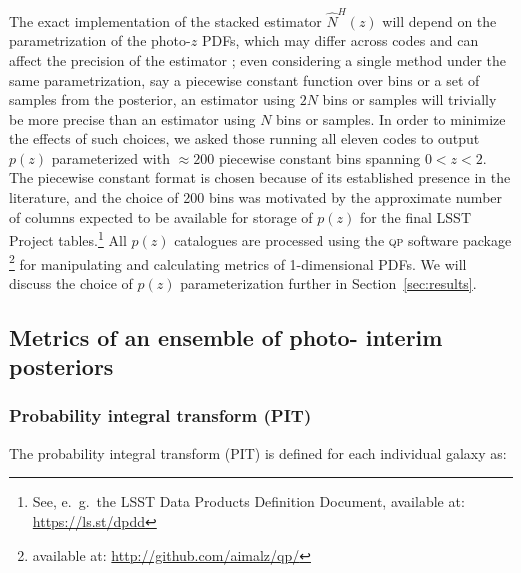The exact implementation of the stacked estimator $\hat{N}^{H}(z)$ will depend on the parametrization of the photo-$z$ PDFs, which may differ across codes and can affect the precision of the estimator \citep{Malz:qp}; even considering a single method under the same parametrization, say a piecewise constant function over bins or a set of samples from the posterior, an estimator using $2N$ bins or samples will trivially be more precise than an estimator using $N$ bins or samples.
In order to minimize the effects of such choices, we asked those running all eleven codes to output $p(z)$ parameterized with $\approx 200$ piecewise constant bins spanning $0<z<2$.
The piecewise constant format is chosen because of its established presence in the literature, and the choice of 200 bins was motivated by the approximate number of columns expected to be available for storage of $p(z)$ for the final LSST Project tables.\footnote{See, e.~g.~the LSST Data Products Definition Document, available at: \url{https://ls.st/dpdd}}
All $p(z)$ catalogues are processed using the \textsc{qp} software package \citep{Malz:qp}\footnote{available at: \url{http://github.com/aimalz/qp/}} for manipulating and calculating metrics of 1-dimensional PDFs.
We will discuss the choice of $p(z)$ parameterization further in Section~\ref{sec:results}.


\subsection{Metrics of an ensemble of photo- interim posteriors}
\label{sec:qualmet}

\subsubsection{Probability integral transform (PIT)}
\label{sec:pit}

The probability integral transform (PIT) \citep{Polsterer:16} is defined for each individual galaxy as:%

